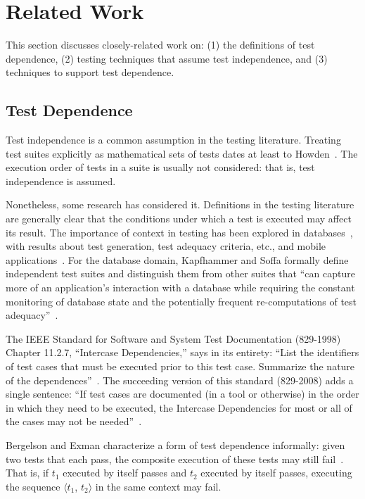 \section{Related Work}

This section discusses closely-related work on: (1)
the definitions of test dependence, (2)
testing techniques that assume test independence,
and (3) techniques to support test dependence.

\subsection{Test Dependence}

Test independence is a common assumption in the testing literature.
Treating test suites explicitly as mathematical sets of tests
dates at least to Howden~\cite{howden:ToC:1975}.
The execution order of tests in a suite is
usually not considered: that is, test independence is assumed.


Nonetheless, some research has considered it.
Definitions in the testing literature are generally clear that
the conditions under which a test is executed may affect
its result. The importance of context in testing has been explored
in databases~\cite{Gray:1994:QGB:191843.191886,Chays:2000:FTD:347324.348954, kapfhammeretal:FSE:2003}, with results about test generation,
test adequacy criteria, etc., and mobile applications~\cite{Wang:2007:AGC}. For
the database domain, Kapfhammer and Soffa formally define
independent test suites and distinguish them from other
suites that ``can capture more of an application's interaction
with a database while requiring the constant monitoring of
database state and the potentially frequent re-computations
of test adequacy''~\cite{kapfhammeretal:FSE:2003}. 

The IEEE Standard for Software and System Test
Documentation (829-1998) Chapter 11.2.7, ``Intercase Dependencies,''
says in its entirety: ``List the identifiers of test cases that must
be executed prior to this test case. Summarize the nature
of the dependences''~\cite{IEEE:829-1998}. The succeeding version of this
standard (829-2008) adds a single sentence: ``If test cases are
documented (in a tool or otherwise) in the order in which
they need to be executed, the Intercase Dependencies for
most or all of the cases may not be needed''~\cite{IEEE:829-2008}.


Bergelson and Exman characterize a form of test dependence
informally: given two tests that each pass, the
composite execution of these tests may still fail~\cite{bergelsonetal:EEE:2006}.
That is, if \textit{$t_1$} executed by itself passes and
\textit{$t_2$} executed by itself passes,
executing the sequence $\langle$\textit{$t_1$}, \textit{$t_2$}$\rangle$ in
the same context may fail.


